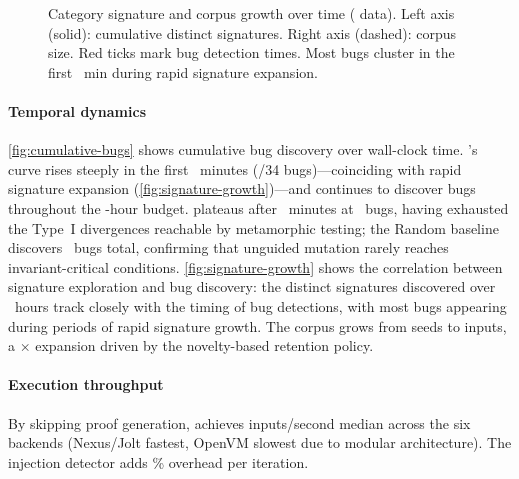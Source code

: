 \begin{figure}[t]
    \caption{Category signature and corpus growth over time ( data). Left axis (solid): cumulative distinct signatures. Right axis (dashed): corpus size. Red ticks mark bug detection times. Most bugs cluster in the first ~min during rapid signature expansion.}
    \label{fig:signature-growth}
\end{figure}

\paragraph{Temporal dynamics}
\autoref{fig:cumulative-bugs} shows cumulative bug discovery over wall-clock time. \tool's curve rises steeply in the first ~minutes (/34 bugs)---coinciding with rapid signature expansion (\autoref{fig:signature-growth})---and continues to discover bugs throughout the -hour budget. \arguzz plateaus after ~minutes at ~bugs, having exhausted the Type~I divergences reachable by metamorphic testing; the Random baseline discovers ~bugs total, confirming that unguided mutation rarely reaches invariant-critical conditions. \autoref{fig:signature-growth} shows the correlation between signature exploration and bug discovery: the  distinct signatures discovered over ~hours track closely with the timing of bug detections, with most bugs appearing during periods of rapid signature growth. The corpus grows from  seeds to  inputs, a $\times$ expansion driven by the novelty-based retention policy.

\paragraph{Execution throughput}
By skipping proof generation, \tool achieves  inputs/second median across the six backends (Nexus/Jolt fastest, OpenVM slowest due to modular architecture). The injection detector adds \% overhead per iteration.


